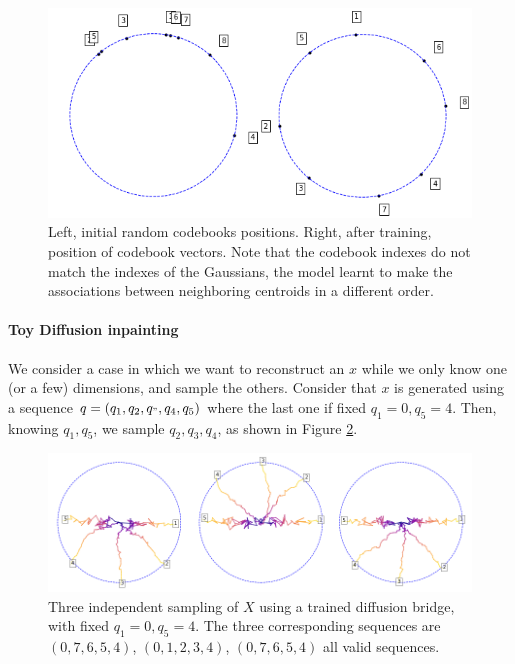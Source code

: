 \documentclass[nolayout]{article}
\theoremstyle{plain}
\theoremstyle{definition}
\theoremstyle{remark}
\begin{document}
\begin{figure}[h!]
    \centering
    \includegraphics[scale=0.4]{images/codebookstraining.png}
    \caption{Left, initial random codebooks positions. Right, after training, position of codebook vectors. Note that the codebook indexes do not match the indexes of the Gaussians, the model learnt to make the associations between neighboring centroids in a different order.}
    \label{ap:codebooks}
\end{figure}

\paragraph{Toy Diffusion inpainting}

\label{ap:toyinpainting}
We consider a case in which we want to reconstruct an $x$ while we only know one (or a few) dimensions, and sample the others. Consider that $x$ is generated using a sequence $q= (q_1,q_2,q_",q_4,q_5)$ where the last one if fixed $q_1 = 0, q_5 = 4$. Then, knowing $q_1, q_5$, we sample $q_2,q_3,q_4$, as shown in Figure \ref{fig:fixeddim}.
\begin{figure}[h!]
    \centering
    \includegraphics[scale=0.4]{images/samplesFixed.png}
    \caption{Three independent sampling of $X$ using a trained diffusion bridge, with fixed $q_1 = 0, q_5 = 4$. The three corresponding sequences are $(0,7,6,5,4)$, $(0,1,2,3,4)$, $(0,7,6,5,4)$ all valid sequences.}
    \label{fig:fixeddim}
\end{figure}
\end{document}
